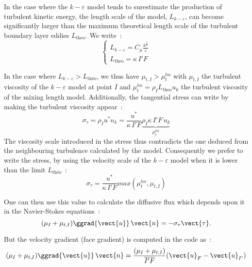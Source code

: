 In the case where the  $k-\varepsilon$  model tends to surestimate
the production of turbulent kinetic energy, the length scale of the model,
$L_{k-\varepsilon}$,
can become significantly larger than the maximum theoretical length scale
of the turbulent boundary layer eddies  $L_{\text{theo}}$. We write~:
\begin{equation}
\left\{\begin{array}{l}
L_{k-\varepsilon} = C_{\mu}\displaystyle\frac{k^\frac{3}{2}}{\varepsilon}\\
L_{\text{theo}} = \kappa\, I'F
\end{array}\right.
\end{equation}

In the case where $L_{k-\varepsilon}>L_{\text{th\'eo}}$, we thus have
$\mu_{t,I}>\mu_{t}^{lm}$ with $\mu_{t,I}$ the turbulent viscosity of the
$k-\varepsilon$ model at point $I$ and $\mu_{t}^{lm}=\rho_I L_{\text{theo}}u_k$
the turbulent viscosity of the mixing length model. Additionally, the
tangential stress can write by making the turbulent viscosity appear~:
\begin{equation}
\sigma_\tau = \rho_Iu^*u_k = \displaystyle\frac{u^*}{\kappa\, I'F}\underbrace{\rho_I\kappa\, I'F\, u_k}_{\mu^{lm}_t}
\end{equation}
The viscosity scale introduced in the stress thus contradicts the one deduced
from the neighbouring turbulence calculated by the model.
Consequently we prefer to write the stress, by using the velocity scale of the $k-\varepsilon$ model when it is lower than
the limit $L_{\text{th\'eo}}$~:
\begin{equation}
\sigma_\tau = \displaystyle\frac{u^*}{\kappa\, I'F} max(\mu_{t}^{lm},\mu_{t,I})
\end{equation}

One can then use this value to calculate the diffusive flux
which depends upon it in the Navier-Stokes equations~:
\begin{equation}\label{Base_Clptur_eq_grad_sigma_clptur}
(\mu_I+\mu_{t,I})\ggrad{\vect{u}}\,\vect{n}=-\sigma_\tau \vect{\tau}.
\end{equation}

But the velocity gradient (face gradient) is computed in the code as~:
\begin{equation}\label{Base_Clptur_eq_grad_uf_clptur}
(\mu_I+\mu_{t,I})\ggrad{\vect{u}}\,\vect{n}=
\displaystyle\frac{(\mu_I+\mu_{t,I})}{\overline{I'F}}(\vect{u}_F-\vect{u}_{I'})
\end{equation}

